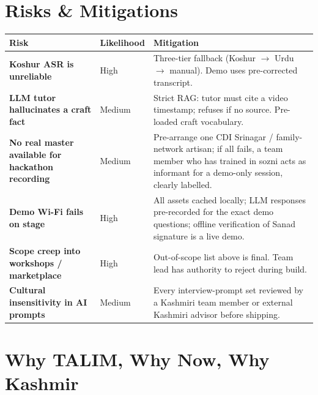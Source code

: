 \documentclass[11pt, a4paper]{article}
\begin{document}
\section{Risks \& Mitigations}

\begin{center}
\small
\begin{tabularx}{\linewidth}{>{\bfseries}lXX}
\toprule
Risk & Likelihood & Mitigation \\
\midrule
Koshur ASR is unreliable & High & Three-tier fallback (Koshur $\to$ Urdu $\to$ manual). Demo uses pre-corrected transcript. \\
LLM tutor hallucinates a craft fact & Medium & Strict RAG: tutor must cite a video timestamp; refuses if no source. Pre-loaded craft vocabulary. \\
No real master available for hackathon recording & Medium & Pre-arrange one CDI Srinagar / family-network artisan; if all fails, a team member who has trained in sozni acts as informant for a demo-only session, clearly labelled. \\
Demo Wi-Fi fails on stage & High & All assets cached locally; LLM responses pre-recorded for the exact demo questions; offline verification of Sanad signature is a live demo. \\
Scope creep into workshops / marketplace & High & Out-of-scope list above is final. Team lead has authority to reject during build. \\
Cultural insensitivity in AI prompts & Medium & Every interview-prompt set reviewed by a Kashmiri team member or external Kashmiri advisor before shipping. \\
\bottomrule
\end{tabularx}
\end{center}

\section{Why TALIM, Why Now, Why Kashmir}
\end{document}
